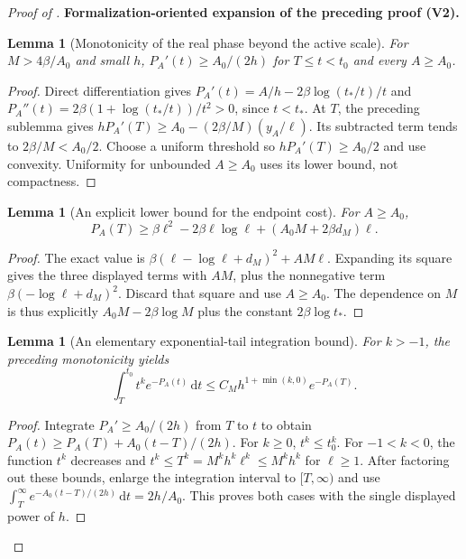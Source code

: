 \documentclass[11pt]{article}
\newtheorem{lemma}[theorem]{Lemma}
\newcommand{\formalisationparentid}{X}
\newenvironment{formalisationaddition}[1]{\par\medskip\begingroup\color{blue}\def\formalisationparentid{#1}\setcounter{formalizationsublemma}{0}\let\lemma\formalizationsublemma\let\endlemma\endformalizationsublemma
  \def\Eo{\mathcal E_h^\circ}\def\EE{\mathcal E_h}\def\phio{\phi_h^\circ}\def\phih{\phi_h}\def\Ho{H_h^{\rm atom}(v^\circ)}\def\Ha{H_h^{\rm atom}}\def\HL{H_h^{L}}\def\Dh{D_h}\def\Log{\operatorname{Log}}\def\ellh{\ell_h}\def\Gp{G_{p,h}}\def\Ast{A_{*,h}}\def\ahat{\widehat{\mathfrak a}_h}\def\ah{\mathfrak a_h}\def\rh{\widehat\rho_h}\def\deltah{\widehat\delta_h}\def\oldref##1{\textup{(##1)}}\def\interface##1{\par\noindent\textit{Analytical interface used here.} ##1\par}\def\finish{\par\noindent\textit{Conclusion of the formalization-oriented expansion.} }\par\noindent\textbf{Formalization-oriented expansion of the preceding proof (V2).}\par\smallskip
}{\par\endgroup\medskip
}
\begin{document}
\begin{proof}[Proof of ]
\begin{formalisationaddition}{D-L6.6}
\begin{lemma}[Monotonicity of the real phase beyond the active scale]\label{sublemma:D6-6-monotonicity}
For $M>4\beta/A_0$ and small $h$,
$P_A'(t)\ge A_0/(2h)$ for $T\le t<t_0$ and every $A\ge A_0$.
\end{lemma}
\begin{proof}
Direct differentiation gives
$P_A'(t)=A/h-2\beta\log(t_*/t)/t$ and
$P_A''(t)=2\beta(1+\log(t_*/t))/t^2>0$, since $t<t_*.$
At $T$, the preceding sublemma gives
$hP_A'(T)\ge A_0-(2\beta/M)(y_A/\ell)$.
Its subtracted term tends to $2\beta/M<A_0/2$.
Choose a uniform threshold so $hP_A'(T)\ge A_0/2$ and use convexity.
Uniformity for unbounded $A\ge A_0$ uses its lower bound, not compactness.
\end{proof}

\begin{lemma}[An explicit lower bound for the endpoint cost]\label{sublemma:D6-6-endpoint-cost}
For $A\ge A_0$,
\[
 P_A(T)\ge\beta\ell^2-2\beta\ell\log\ell
                 +(A_0M+2\beta d_M)\ell.
\]
\end{lemma}
\begin{proof}
The exact value is
$\beta(\ell-\log\ell+d_M)^2+AM\ell$.
Expanding its square gives the three displayed terms with $AM$,
plus the nonnegative term $\beta(-\log\ell+d_M)^2$.
Discard that square and use $A\ge A_0$.
The dependence on $M$ is thus explicitly $A_0M-2\beta\log M$
plus the constant $2\beta\log t_*$.
\end{proof}

\begin{lemma}[An elementary exponential-tail integration bound]\label{sublemma:D6-6-tail-prefactor}
For $k>-1$, the preceding monotonicity yields
\[
 \int_T^{t_0}t^ke^{-P_A(t)}\,\mathrm dt
           \le C_M h^{1+\min(k,0)}e^{-P_A(T)}.
\]
\end{lemma}
\begin{proof}
Integrate $P_A'\ge A_0/(2h)$ from $T$ to $t$ to obtain
$P_A(t)\ge P_A(T)+A_0(t-T)/(2h)$.
For $k\ge0$, $t^k\le t_0^k$. For $-1<k<0$, the function $t^k$
decreases and $t^k\le T^k=M^kh^k\ell^k\le M^kh^k$ for $\ell\ge1$.
After factoring out these bounds, enlarge the integration interval to
$[T,\infty)$ and use
$\int_T^\infty e^{-A_0(t-T)/(2h)}\,\mathrm dt=2h/A_0$.
This proves both cases with the single displayed power of $h$.
\end{proof}


\end{formalisationaddition}
\end{proof}
\end{document}
